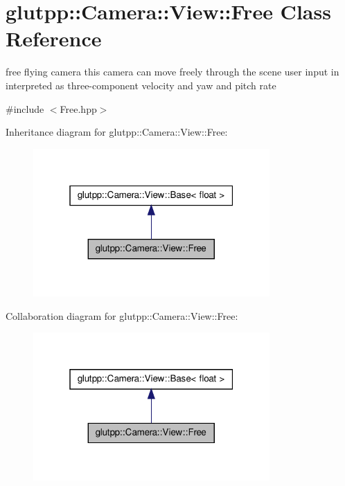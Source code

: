 \hypertarget{classglutpp_1_1Camera_1_1View_1_1Free}{\section{glutpp\-:\-:\-Camera\-:\-:\-View\-:\-:\-Free \-Class \-Reference}
\label{classglutpp_1_1Camera_1_1View_1_1Free}
}


free flying camera this camera can move freely through the scene user input in interpreted as three-\/component velocity and yaw and pitch rate  




{\ttfamily \#include $<$\-Free.\-hpp$>$}



\-Inheritance diagram for glutpp\-:\-:\-Camera\-:\-:\-View\-:\-:\-Free\-:\nopagebreak
\begin{figure}[H]
\begin{center}
\leavevmode
\includegraphics[width=256pt]{classglutpp_1_1Camera_1_1View_1_1Free__inherit__graph}
\end{center}
\end{figure}


\-Collaboration diagram for glutpp\-:\-:\-Camera\-:\-:\-View\-:\-:\-Free\-:\nopagebreak
\begin{figure}[H]
\begin{center}
\leavevmode
\includegraphics[width=256pt]{classglutpp_1_1Camera_1_1View_1_1Free__coll__graph}
\end{center}
\end{figure}
